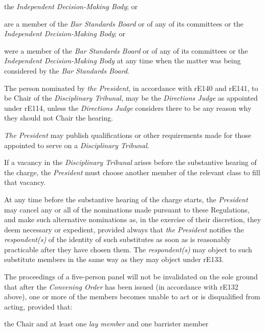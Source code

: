 the \emph{Independent Decision-Making Body}; or\item are a member of the \emph{Bar Standards Board} or of any of its
committees or the \emph{Independent Decision-Making Body}; or\item were a member of the \emph{Bar Standards Board} or of any of its
committees or the \emph{Independent Decision-Making Body} at any time
when the matter was being considered by the \emph{Bar Standards
Board}.\ln
{}\par
The person nominated by \emph{the President, }in accordance with rE140
and rE141, to be Chair of the\emph{ Disciplinary Tribunal, }may be
the \emph{Directions Judge }as appointed under rE114, unless
the \emph{Directions Judge }considers there to be any reason why they
should not Chair the hearing.\\
\par
\emph{The President} may publish qualifications or other requirements
made for those appointed to serve on a \emph{Disciplinary Tribunal}.\\
\par
If a vacancy in the \emph{Disciplinary Tribunal} arises before the
substantive hearing of the charge, the \emph{President }must choose
another member of the relevant class to fill that vacancy.\\
\par
At any time before the substantive hearing of the charge starts,
the \emph{President} may cancel any or all of the nominations made
pursuant to these Regulations, and make such alternative nominations as,
in the exercise of their discretion, they deem necessary or expedient,
provided always that \emph{the President} notifies
the \emph{respondent(s)} of the identity of such substitutes as soon as
is reasonably practicable after they have chosen them.
The \emph{respondent(s) }may object to such substitute members in the
same way as they may object under rE133.\\
\par
The proceedings of a five-person panel will not be invalidated on the
sole ground that after the \emph{Convening Order} has been issued (in
accordance with rE132 above), one or more of the members becomes unable
to act or is disqualified from acting, provided that:\\\nl \item the Chair and at least one \emph{lay member} and one barrister member
